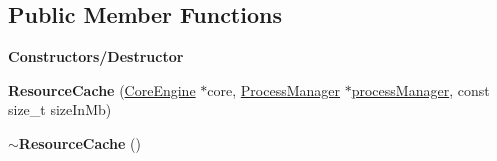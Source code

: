 \subsection*{Public Member Functions}
\begin{Indent}\textbf{ Constructors/\+Destructor}\par
\begin{DoxyCompactItemize}
\item 
\mbox{\label{classrev_1_1_resource_cache_af37abcfc41c1c1303140cf20487b164b}} 
{\bfseries Resource\+Cache} (\mbox{\hyperlink{classrev_1_1_core_engine}{Core\+Engine}} $\ast$core, \mbox{\hyperlink{classrev_1_1_process_manager}{Process\+Manager}} $\ast$\mbox{\hyperlink{classrev_1_1_resource_cache_a375d3dd14e3d469e93005b9e059c8a89}{process\+Manager}}, const size\+\_\+t size\+In\+Mb)
\item 
\mbox{\label{classrev_1_1_resource_cache_a5b92e94d9b51204099ebb2f9ac311721}} 
{\bfseries $\sim$\+Resource\+Cache} ()
\end{DoxyCompactItemize}
\end{Indent}
